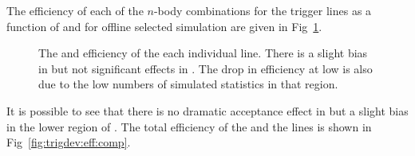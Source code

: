 The efficiency of each of the $n$-body combinations for the \muntrack trigger lines as a function of \ctl and \qsq for offline selected \BdToKstmm simulation
 are given in Fig~\ref{fig:trigdev:eff:muntrack}.
\begin{figure}[tbp]
\centering
{}
\caption[Efficiency of the \muntrack triggers on \BdToKstmm simulation.]
{ The \ctl and \qsq efficiency of the each individual \muntrack line. There is a slight bias in \ctl but not significant effects in \qsq. 
The drop in efficiency at low \ctl is also due to the low numbers of simulated statistics in that region. ~\label{fig:trigdev:eff:muntrack} }
\end{figure}
It is possible to see that there is no dramatic acceptance effect in \qsq but a slight bias in the lower region of \ctl.
The total efficiency of the \muntrack and the \hlttwotopo lines is shown in Fig~\ref{fig:trigdev:eff:comp}.

